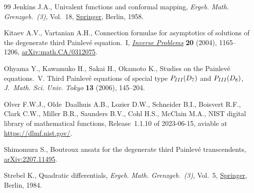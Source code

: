 \documentclass[11pt]{article}
\numberwithin{equation}{section}
\numberwithin{equation}{section}
\begin{document}
\begin{thebibliography}{99}
Jenkins J.A., Univalent functions and conformal mapping, \textit{Ergeb. Math.
 Grenzgeb.~(3)}, Vol.~18, \href{https://doi.org/10.1007/978-3-662-34447-7}{Springer}, Berlin, 1958.

Kitaev A.V., Vartanian A.H., Connection formulae for asymptotics of solutions
 of the degenerate third {P}ainlev\'e equation.~{I}, \href{https://doi.org/10.1088/0266-5611/20/4/010}{\textit{Inverse Problems}}
 \textbf{20} (2004), 1165--1206, \href{https://arxiv.org/abs/#2}{arXiv:math.CA/0312075}.

Ohyama Y., Kawamuko H., Sakai H., Okamoto K., Studies on the {P}ainlev\'e
 equations.~{V}. {T}hird {P}ainlev\'e equations of special type {${\rm P}_{\rm
 III}({\rm D}_7)$} and {${\rm P}_{\rm III}({\rm D}_8)$}, \textit{J.~Math. Sci.
 Univ. Tokyo} \textbf{13} (2006), 145--204.

Olver F.W.J., Olde~Daalhuis A.B., Lozier D.W., Schneider B.I., Boisvert R.F.,
 Clark C.W., Miller B.R., Saunders B.V., Cohl H.S., McClain M.A., NIST digital
 library of mathematical functions, {R}elease~1.1.10 of 2023-06-15, aviable at
 \url{https://dlmf.nist.gov/}.

Shimomura S., Boutroux ansatz for the degenerate third {P}ainlev\'e
 transcendents, \href{https://arxiv.org/abs/2207.11495}{arXiv:2207.11495}.

Strebel K., Quadratic differentials, \textit{Ergeb. Math. Grenzgeb.~(3)},
 Vol.~5, \href{https://doi.org/10.1007/978-3-662-02414-0}{Springer}, Berlin, 1984.

\end{thebibliography}
\end{document}
